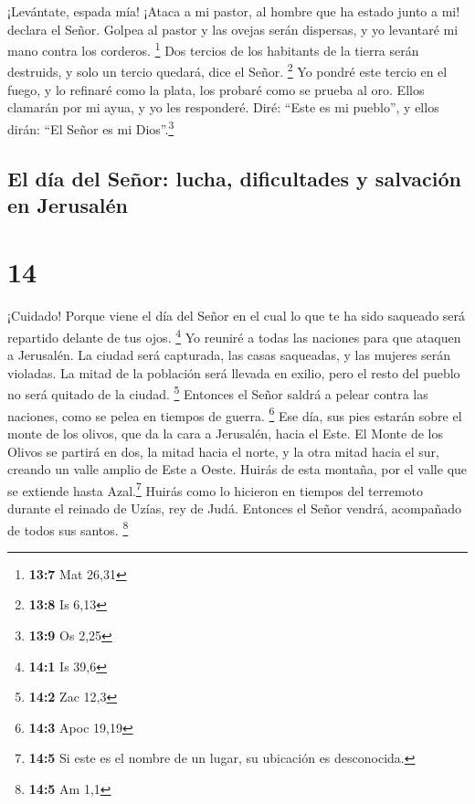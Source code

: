  ¡Levántate, espada mía! ¡Ataca a mi pastor, al hombre que
ha estado junto a mi! declara el Señor. Golpea al pastor y las ovejas
serán dispersas, y yo levantaré mi mano contra los corderos. \footnote{\textbf{13:7}
  Mat 26,31}  Dos tercios de los habitants de la tierra
serán destruids, y solo un tercio quedará, dice el Señor. \footnote{\textbf{13:8}
  Is 6,13}  Yo pondré este tercio en el fuego, y lo
refinaré como la plata, los probaré como se prueba al oro. Ellos
clamarán por mi ayua, y yo les responderé. Diré: ``Este es mi pueblo'',
y ellos dirán: ``El Señor es mi Dios''.\footnote{\textbf{13:9} Os 2,25}

\hypertarget{el-duxeda-del-seuxf1or-lucha-dificultades-y-salvaciuxf3n-en-jerusaluxe9n}{%
\subsection{El día del Señor: lucha, dificultades y salvación en
Jerusalén}\label{el-duxeda-del-seuxf1or-lucha-dificultades-y-salvaciuxf3n-en-jerusaluxe9n}}

\hypertarget{section-13}{%
\section{14}\label{section-13}}

 ¡Cuidado! Porque viene el día del Señor en el cual lo que
te ha sido saqueado será repartido delante de tus ojos. \footnote{\textbf{14:1}
  Is 39,6}  Yo reuniré a todas las naciones para que
ataquen a Jerusalén. La ciudad será capturada, las casas saqueadas, y
las mujeres serán violadas. La mitad de la población será llevada en
exilio, pero el resto del pueblo no será quitado de la ciudad.
\footnote{\textbf{14:2} Zac 12,3}  Entonces el Señor
saldrá a pelear contra las naciones, como se pelea en tiempos de guerra.
\footnote{\textbf{14:3} Apoc 19,19}  Ese día, sus pies
estarán sobre el monte de los olivos, que da la cara a Jerusalén, hacia
el Este. El Monte de los Olivos se partirá en dos, la mitad hacia el
norte, y la otra mitad hacia el sur, creando un valle amplio de Este a
Oeste.  Huirás de esta montaña, por el valle que se
extiende hasta Azal.\footnote{\textbf{14:5} Si este es el nombre de un
  lugar, su ubicación es desconocida.} Huirás como lo hicieron en
tiempos del terremoto durante el reinado de Uzías, rey de Judá. Entonces
el Señor vendrá, acompañado de todos sus santos. \footnote{\textbf{14:5}
  Am 1,1}


